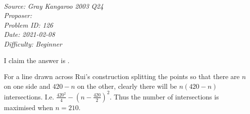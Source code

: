 \SSbreak\\
\emph{Source: Gray Kangaroo 2003 Q24}\\
\emph{Proposer: \Pss}\\
\emph{Problem ID: 126}\\
\emph{Date: 2021-02-08}\\
\emph{Difficulty: Beginner}\\
\SSbreak

\bigskip

\begin{solution}\hfil\medskip

I claim the answer is .\medskip

For a line drawn across Rui's construction splitting the points so that there are \(n\) on one side and \(420-n\) on the other, clearly there will be \(n(420-n)\) intersections. I.e. \(\frac{420^2}{4}-\left(n-\frac{420}{2}\right)^2\). Thus the number of intersections is maximised when \(n=210\).

\end{solution}\bigskip
